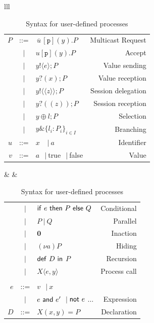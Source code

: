 \documentclass{article}
\newcommand{\pn}{\p}
\newcommand{\ptilde}[1]{{\ensuremath{#1}}}
\newcommand{\kf}[1]{\textup{\textsf{#1}}\xspace}
\newcommand{\srsimple}[3]{\ensuremath{\bar{#1}[#2](#3)}}
\newcommand{\sr}[4]{\ensuremath{\srsimple{#1}{#2}{#3}.#4}}
\newcommand{\uu}{\ensuremath{u}}
\newcommand{\Ia}{\ensuremath{a}}
\newcommand{\y}{\ensuremath{y}}
\newcommand{\PP}{\ensuremath{P}}
\newcommand{\Q}{\ensuremath{Q}}
\newcommand{\DD}{\ensuremath{D}}
\newcommand{\sasimple}[3]{\ensuremath{#1[#2](#3)}}
\newcommand{\sa}[4]{\ensuremath{\sasimple{#1}{#2}{#3}.#4}}
\newcommand{\e}{\ensuremath{e}}
\newcommand{\x}{\ensuremath{x}}
\newcommand{\participant}[1]{\ensuremath{\mathtt{#1}}}
\newcommand{\p}{\ensuremath{\participant{p}}}
\newcommand{\z}{\ensuremath{z}}
\newcommand{\pc}{\Par}
\newcommand{\X}{\ensuremath{X}}
\newcommand{\Xsignature}{\ensuremath{\X(\at{x}, \at{y})}}
\newcommand{\Ddef}{\ensuremath{\Xsignature=\PP}}
\newcommand{\defD}{\ensuremath{\kf{def}\ \DD \ \kf{in}\ }}
\newcommand{\proccall}[3]{\ensuremath{#1\langle\ptilde{#2},\ptilde{#3}\rangle}}
\newcommand{\indexed}[4]{\ensuremath{\{#1_#3 : #2_#3\}_{#3 \in #4}}}
\newcommand{\ifthenelse}[3]{\ensuremath{\kf{if}\ #1\ \kf{then}\ #2\ \kf{else}\ #3}}
\newcommand{\inact}{\ensuremath{\mathbf{0}}}
\newcommand{\nuc}[2]{\ensuremath{(\nu #1)#2}}
\newcommand{\AND}[2]{\ensuremath{#1\ \kf{and}\ #2}}
\newcommand{\NOT}[1]{\ensuremath{\kf{not}\ #1}}
\newcommand{\true}{\kf{true}}
\newcommand{\false}{\kf{false}}
\newcommand{\va}{\ensuremath{v}}
\newcommand{\at}[1]{\ensuremath{\ptilde{#1}}}
\newcommand{\Par}{\ensuremath{\ |\ }}
\newcommand{\sep}{\ensuremath{~\mathbf{|}~ }}
\newcommand{\outS}[3]{\ensuremath{#1!\langle #2\rangle;#3}}
\newcommand{\inpS}[3]{\ensuremath{#1?( #2);#3}}
\newcommand{\sdS}[3]{\ensuremath{#1!\langle\! \langle#2\rangle \!\rangle;#3}}
\newcommand{\rdS}[3]{\ensuremath{#1?(\!(#2)\!);#3}}
\newcommand{\lselS}[3]{\ensuremath{#1 \oplus {#2};#3}}
\newcommand{\lbranchS}[1]{\ensuremath{#1 \& \indexed{l}{\PP}{i}{I}}}
\renewcommand{\bar}[1]{\overline{\,#1\,}}
\begin{document}
\begin{table}[tb]
\centering
\begin{tabular}{lll}
\begin{tabular}{rclr}
 \PP & ::=  & \sr\uu \pn\y\PP   &   {Multicast Request}\\
     & \sep & \sa\uu\p\y\PP   &   {Accept}\\
     & \sep & \outS{\y}\e\PP &    {Value sending}\\
     & \sep & \inpS{\y}\x\PP &    {Value reception}\\
     & \sep & \sdS{\y}{\z} \PP & {Session delegation}\\
     & \sep & \rdS{\y}{\z}\PP &  {Session reception}\\
     & \sep & \lselS{\y}{l}{\PP} & {Selection}\\
     & \sep & \lbranchS{\y} & {Branching}\\[1mm]
\uu & ::= & $\x$ \ \sep \Ia & {Identifier}\\
\va & ::= & \Ia \ \sep \true  \ \sep \false & {Value}\\
\end{tabular}
&
&
\begin{tabular}{rclr}
      & \sep & \ifthenelse{\e}{\PP}{\Q} & {Conditional}\\
      & \sep & \PP \pc \Q  & {Parallel}\\
      & \sep & \inact & {Inaction}\\
      & \sep & \nuc{\Ia}{\PP} & {Hiding}\\
      & \sep & \defD \PP & {Recursion}\\
      & \sep & \proccall{\X}{\e}{\y} & {Process call}
\\
\\[2mm]
\e   & ::= & \va \ \sep \x  \\
&  \sep & \AND{\e}{\e'} \sep \NOT{\e} $\ldots$
&{Expression}\\
\DD   & ::= & \Ddef &{Declaration}\\
\end{tabular}
\end{tabular}
\ \vspace{1mm}
\caption{Syntax for user-defined processes}\label{tab:syntaxM}
\end{table}
\end{document}

